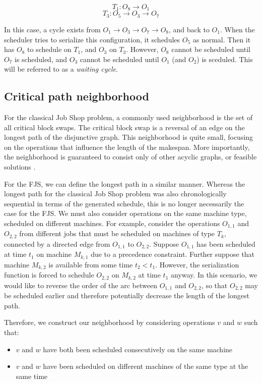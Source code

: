 \documentclass[a4paper,11pt]{article}
\begin{document}
\[ T_1\colon O_8 \rightarrow O_1 \]
\[ T_3\colon O_5 \rightarrow O_3 \rightarrow O_7 \]

In this case, a cycle exists from $O_1 \rightarrow O_3 \rightarrow O_7 \rightarrow O_8$, and back to $O_1$. When the scheduler tries to serialize this configuration, it schedules $O_5$ as normal. Then it has $O_8$ to schedule on $T_1$, and $O_3$ on $T_3$. However, $O_8$ cannot be scheduled until $O_7$ is scheduled, and $O_3$ cannot be scheduled until $O_1$ (and $O_2$) is sceduled. This will be referred to as a \emph{waiting cycle}.

\subsection{Critical path neighborhood}

For the classical Job Shop problem, a commonly used neighborhood is the set of all critical block swaps. The critical block swap is a reversal of an edge on the longest path of the disjunctive graph. This neighborhood is quite small, focusing on the operations that influence the length of the makespan. More importantly, the neighborhood is guaranteed to consist only of other acyclic graphs, or feasible solutions \cite{simulatedannealingjsp}.

For the FJS, we can define the longest path in a similar manner. Whereas the longest path for the classical Job Shop problem was also chronologically sequential in terms of the generated schedule, this is no longer necessarily the case for the FJS. We must also consider operations on the same machine type, scheduled on different machines. For example, consider the operations $O_{1,1}$ and $O_{2,2}$ from different jobs that must be scheduled on machines of type $T_k$, connected by a directed edge from $O_{1,1}$ to $O_{2,2}$. Suppose $O_{1,1}$ has been scheduled at time $t_1$ on machine $M_{k,1}$ due to a precedence constraint. Further suppose that machine $M_{k,2}$ is available from some time $t_2 < t_1$. However, the serialization function is forced to schedule $O_{2,2}$ on $M_{k,2}$ at time $t_1$ anyway. In this scenario, we would like to reverse the order of the arc between $O_{1,1}$ and $O_{2,2}$, so that $O_{2,2}$ may be scheduled earlier and therefore potentially decrease the length of the longest path.

Therefore, we construct our neighborhood by considering operations $v$ and $w$ such that:

\begin{itemize}
	\item $v$ and $w$ have both been scheduled consecutively on the same machine
	\item $v$ and $w$ have been scheduled on different machines of the same type at the same time
\end{itemize}
\end{document}
